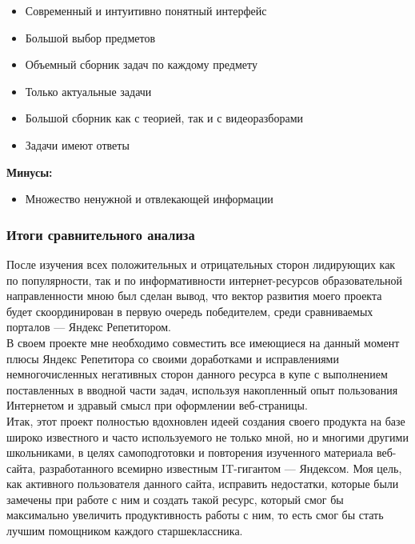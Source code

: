 \documentclass[a4paper, 12pt]{extarticle}
\begin{document}
\begin{enumerate}
\begin{itemize}
        \item Современный и интуитивно понятный интерфейс
        \item Большой выбор предметов
        \item Объемный сборник задач по каждому предмету
        \item Только актуальные задачи
        \item Большой сборник как с теорией, так и с видеоразборами
        \item Задачи имеют ответы
    \end{itemize}
    \textbf{Минусы:}
    \vspace{-2mm}
    \begin{itemize}
        \item Множество ненужной и отвлекающей информации
    \end{itemize}
\end{enumerate}

\subsubsection{Итоги сравнительного анализа}
После изучения всех положительных и отрицательных сторон лидирующих как по
популярности, так и по информативности интернет-ресурсов образовательной
направленности мною был сделан вывод, что вектор развития моего проекта будет
скоординирован в первую очередь победителем, среди сравниваемых порталов —
Яндекс Репетитором.
\\

В своем проекте мне необходимо совместить все имеющиеся на данный момент плюсы
Яндекс Репетитора со своими доработками и исправлениями немногочисленных
негативных сторон данного ресурса в купе с выполнением поставленных в вводной
части задач, используя накопленный опыт пользования Интернетом и здравый смысл
при оформлении веб-страницы.
\\

Итак, этот проект полностью вдохновлен идеей создания своего продукта на базе
широко известного и часто используемого не только мной, но и многими другими
школьниками, в целях самоподготовки и повторения изученного материала веб-сайта,
разработанного всемирно известным IT-гигантом — Яндексом. Моя цель, как
активного пользователя данного сайта, исправить недостатки, которые были
замечены при работе с ним и создать такой ресурс, который смог бы максимально
увеличить продуктивность работы с ним, то есть смог бы стать лучшим помощником
каждого старшеклассника.
\newpage
\end{document}
